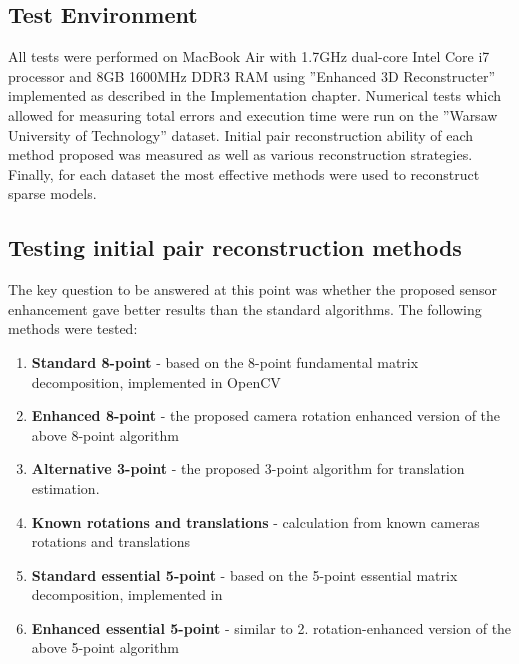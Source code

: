 \subsection{Test Environment}
All tests were performed on MacBook Air with 1.7GHz dual-core Intel Core i7 processor and 8GB 1600MHz DDR3 RAM using ''Enhanced 3D Reconstructer'' implemented as described in the Implementation chapter.  Numerical tests which allowed for measuring total errors and execution time were run on the ''Warsaw University of Technology'' dataset. Initial pair reconstruction ability of each method proposed was measured as well as various reconstruction strategies.  Finally, for each dataset the most effective methods were used to reconstruct sparse models. 
\subsection{Testing initial pair reconstruction methods} \label{sec:Testin2Views}
The key question to be answered at this point was whether the proposed sensor enhancement gave better results than the standard algorithms.
The following methods were tested:
\begin{enumerate}
\item \textbf{Standard 8-point} - based on the 8-point fundamental matrix decomposition, implemented in OpenCV
\item \textbf{Enhanced 8-point} - the proposed camera rotation enhanced version of the above 8-point algorithm
\item \textbf{Alternative 3-point} - the proposed 3-point algorithm for translation estimation.
\item \textbf{Known rotations and translations} - calculation from known cameras rotations and translations
\item \textbf{Standard essential 5-point} - based on the 5-point essential matrix decomposition, implemented in \cite{website:relativePoseLibrary}
\item \textbf{Enhanced essential 5-point} - similar to 2. rotation-enhanced version of the above 5-point algorithm
\end{enumerate}
